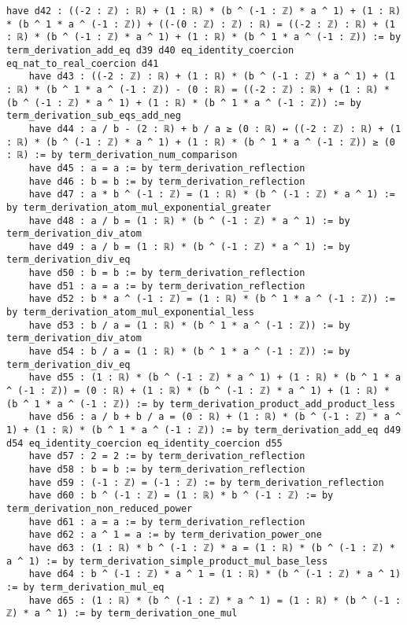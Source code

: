 \documentclass{article}
\begin{document}
\begin{tcolorbox}[colback=white!10, width=\linewidth]
\begin{lstlisting}[language=Lean4]
    have d42 : ((-2 : ℤ) : ℝ) + (1 : ℝ) * (b ^ (-1 : ℤ) * a ^ 1) + (1 : ℝ) * (b ^ 1 * a ^ (-1 : ℤ)) + ((-(0 : ℤ) : ℤ) : ℝ) = ((-2 : ℤ) : ℝ) + (1 : ℝ) * (b ^ (-1 : ℤ) * a ^ 1) + (1 : ℝ) * (b ^ 1 * a ^ (-1 : ℤ)) := by term_derivation_add_eq d39 d40 eq_identity_coercion eq_nat_to_real_coercion d41
    have d43 : ((-2 : ℤ) : ℝ) + (1 : ℝ) * (b ^ (-1 : ℤ) * a ^ 1) + (1 : ℝ) * (b ^ 1 * a ^ (-1 : ℤ)) - (0 : ℝ) = ((-2 : ℤ) : ℝ) + (1 : ℝ) * (b ^ (-1 : ℤ) * a ^ 1) + (1 : ℝ) * (b ^ 1 * a ^ (-1 : ℤ)) := by term_derivation_sub_eqs_add_neg
    have d44 : a / b - (2 : ℝ) + b / a ≥ (0 : ℝ) ↔ ((-2 : ℤ) : ℝ) + (1 : ℝ) * (b ^ (-1 : ℤ) * a ^ 1) + (1 : ℝ) * (b ^ 1 * a ^ (-1 : ℤ)) ≥ (0 : ℝ) := by term_derivation_num_comparison
    have d45 : a = a := by term_derivation_reflection
    have d46 : b = b := by term_derivation_reflection
    have d47 : a * b ^ (-1 : ℤ) = (1 : ℝ) * (b ^ (-1 : ℤ) * a ^ 1) := by term_derivation_atom_mul_exponential_greater
    have d48 : a / b = (1 : ℝ) * (b ^ (-1 : ℤ) * a ^ 1) := by term_derivation_div_atom
    have d49 : a / b = (1 : ℝ) * (b ^ (-1 : ℤ) * a ^ 1) := by term_derivation_div_eq
    have d50 : b = b := by term_derivation_reflection
    have d51 : a = a := by term_derivation_reflection
    have d52 : b * a ^ (-1 : ℤ) = (1 : ℝ) * (b ^ 1 * a ^ (-1 : ℤ)) := by term_derivation_atom_mul_exponential_less
    have d53 : b / a = (1 : ℝ) * (b ^ 1 * a ^ (-1 : ℤ)) := by term_derivation_div_atom
    have d54 : b / a = (1 : ℝ) * (b ^ 1 * a ^ (-1 : ℤ)) := by term_derivation_div_eq
    have d55 : (1 : ℝ) * (b ^ (-1 : ℤ) * a ^ 1) + (1 : ℝ) * (b ^ 1 * a ^ (-1 : ℤ)) = (0 : ℝ) + (1 : ℝ) * (b ^ (-1 : ℤ) * a ^ 1) + (1 : ℝ) * (b ^ 1 * a ^ (-1 : ℤ)) := by term_derivation_product_add_product_less
    have d56 : a / b + b / a = (0 : ℝ) + (1 : ℝ) * (b ^ (-1 : ℤ) * a ^ 1) + (1 : ℝ) * (b ^ 1 * a ^ (-1 : ℤ)) := by term_derivation_add_eq d49 d54 eq_identity_coercion eq_identity_coercion d55
    have d57 : 2 = 2 := by term_derivation_reflection
    have d58 : b = b := by term_derivation_reflection
    have d59 : (-1 : ℤ) = (-1 : ℤ) := by term_derivation_reflection
    have d60 : b ^ (-1 : ℤ) = (1 : ℝ) * b ^ (-1 : ℤ) := by term_derivation_non_reduced_power
    have d61 : a = a := by term_derivation_reflection
    have d62 : a ^ 1 = a := by term_derivation_power_one
    have d63 : (1 : ℝ) * b ^ (-1 : ℤ) * a = (1 : ℝ) * (b ^ (-1 : ℤ) * a ^ 1) := by term_derivation_simple_product_mul_base_less
    have d64 : b ^ (-1 : ℤ) * a ^ 1 = (1 : ℝ) * (b ^ (-1 : ℤ) * a ^ 1) := by term_derivation_mul_eq
    have d65 : (1 : ℝ) * (b ^ (-1 : ℤ) * a ^ 1) = (1 : ℝ) * (b ^ (-1 : ℤ) * a ^ 1) := by term_derivation_one_mul

\end{lstlisting}
\end{tcolorbox}
\end{document}
